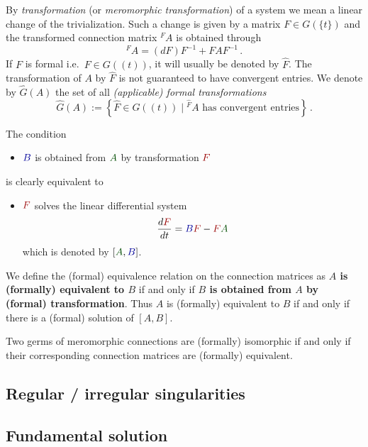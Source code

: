 By \emph{transformation} (or \emph{meromorphic transformation}) of a system we
mean a linear change of the trivialization.
Such a change is given by a matrix $F\in G(\!\{t\}\!)$ and the transformed
connection matrix ${}^F\!A$ is obtained through
\[
  {}^F\!A=(dF)F^{-1} + FAF^{-1} \,.
\]
If $F$ is formal i.e.\ $F\in G(\!(t)\!)$, it will usually be denoted by
$\hat F$.
The transformation of $A$ by $\hat F$ is not guaranteed to have convergent
entries.
We denote by $\hat G(A)$ the set of all \emph{(applicable) formal
transformations}
\[
  \hat G(A):=\left\{\hat F\in G(\!(t)\!)
    \mid {}^{\hat F}\!A \text{ has convergent entries}
  \right\}\,.
\]
\begin{rem}
  \def\myB{\textcolor{blue!60!black}{B}}
  \def\myA{\textcolor{green!30!black}{A}}
  \def\myF{\textcolor{red!60!black}{F}}
  The condition
  \begin{itemize}
    \item[] $\myB$ is obtained from $\myA$ by transformation $\myF$
  \end{itemize}
  is clearly equivalent to
  \begin{itemize}
    \item[]  $\myF$ solves the linear differential system
      \[
        \frac{d\myF}{dt}=\myB\myF-\myF\myA
      \]
      which is denoted by $[\myA,\myB]$.
  \end{itemize}
\end{rem}
We define the (formal) equivalence relation on the connection matrices as
\textbf{\boldmath$A$ is (formally) equivalent to $B$} if and only if
\textbf{\boldmath$B$ is obtained from $A$ by (formal) transformation}.
Thus $A$ is (formally) equivalent to $B$ if and only if there is a (formal)
solution of $[A,B]$.

\begin{defn}
  Two germs of meromorphic connections are (formally) isomorphic if and only if
  their corresponding connection matrices are (formally) equivalent.
\end{defn}

\subsection{Regular / irregular singularities}

\subsection{Fundamental solution}

